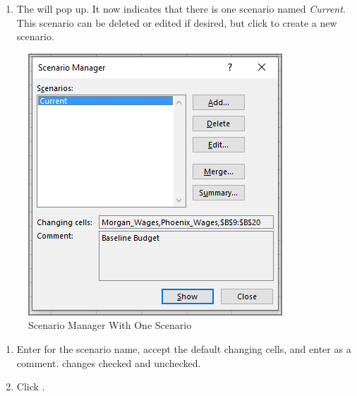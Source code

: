 \begin{enumerate}[resume]	
	
	\item The  will pop up. It now indicates that there is one scenario named \textit{Current}. This scenario can be deleted or edited if desired, but click  to create a new scenario.
	
\end{enumerate}

\begin{figure}[H]
	\centering
	\includegraphics[width=\maxwidth{.95\linewidth}]{gfx/ch08_fig26}
	\caption{Scenario Manager With One Scenario}
	\label{08:fig26}
\end{figure}

\begin{enumerate}[resume]	
	
	\item Enter  for the scenario name, accept the default changing cells, and enter  as a comment.  changes checked and  unchecked.
	\item Click .
	
\end{enumerate}

